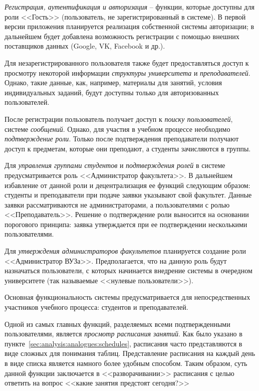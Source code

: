 \emph{Регистрация, аутентификация и авторизация} -- функции, которые доступны для роли <<Гость>> (пользователь, не зарегистрированный в системе). В первой версии приложения планируется реализация собственной системы авторизации; в дальнейшем будет добавлена возможность регистрации с помощью внешних поставщиков данных (Google, VK, Facebook и др.).

Для незарегистрированного пользователя также будет предоставляться доступ к просмотру некоторой информации \emph{структуры университета} и \emph{преподавателей}. Однако, такие данные, как, например, материалы для занятий, условия индивидуальных заданий, будут доступны только для авторизованных пользователей. 

После регистрации пользователь получает доступ к \emph{поиску пользователей}, системе \emph{сообщений}. Однако, для участия в учебном процессе необходимо \emph{подтверждение роли}. Только после подтверждения преподаватели получают доступ к предметам, которые они преподают, а студенты зачисляются в группы. 

Для \emph{управления группами студентов} и \emph{подтверждения ролей} в системе предусматривается роль <<Администратор факультета>>. В дальнейшем избавление от данной роли и децентрализация ее функций следующим образом: студенты и преподаватели при подаче заявки указывают свой факультет. Данные заявки рассматриваются не администраторами, а пользователями с ролью <<Преподаватель>>. Решение о подтверждение роли выносится на основании порогового принципа: заявка утверждается при ее подтверждении несколькими пользователями. 

Для \emph{утверждения администраторов факультетов} планируется создание роли <<Администратор ВУЗа>>. Предполагается, что на данную роль будут назначаться пользователи, с которых начинается внедрение системы в очередном университете (так называемые <<нулевые пользователи>>). 

Основная функциональность системы предусматривается для непосредственных участников учебного процесса: студентов и преподавателей. 

Одной из самых главных функций, разделяемых всеми подтвержденными пользователями, является \emph{просмотр расписания занятий}. Как было указано в пункте~\ref{sec:analysis:analogues:schedules}, расписания часто представляются в виде сложных для понимания таблиц. Представление расписания на каждый день в виде списка является намного более удобным способом. Таким образом, суть данной функции заключается в <<разворачивании>> расписания с целью ответить на вопрос <<какие занятия предстоят сегодня?>>

